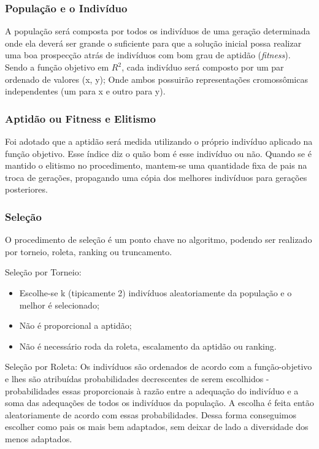 \documentclass[12pt,a4paper]{article}
\begin{document}
\subsubsection{População e o Indivíduo}

\hspace{4ex}A população será composta por todos os indivíduos de uma geração determinada onde ela deverá ser grande o suficiente para que a solução inicial possa realizar uma boa prospecção atrás de indivíduos com bom grau de aptidão (\textit{fitness}). Sendo a função objetivo em $R^2$, cada indivíduo será composto por um par ordenado de valores (x, y); Onde ambos possuirão representações cromossômicas independentes (um para x e outro para y).

\subsubsection{Aptidão ou Fitness e Elitismo}

\hspace{4ex}Foi adotado que a aptidão será medida utilizando o próprio indivíduo aplicado na função objetivo. Esse índice diz o quão bom é esse indivíduo ou não. Quando se é mantido o elitismo no procedimento, mantem-se uma quantidade fixa de pais na troca de gerações, propagando uma cópia dos melhores indivíduos para gerações posteriores.

\newpage
\thispagestyle{main}

\subsubsection{Seleção}

\hspace{4ex}O procedimento de seleção é um ponto chave no algoritmo, podendo ser realizado por torneio, roleta, ranking ou truncamento.

Seleção por Torneio:
\begin{itemize}
	\item Escolhe-se k (tipicamente 2) indivíduos aleatoriamente da população e o melhor é selecionado;
	\item Não é proporcional a aptidão;
	\item Não é necessário roda da roleta, escalamento da aptidão ou ranking.
\end{itemize}

Seleção por Roleta: Os indivíduos são ordenados de acordo com a função-objetivo e lhes são atribuídas probabilidades decrescentes de serem escolhidos - probabilidades essas proporcionais à razão entre a adequação do indivíduo e a soma das adequações de todos os indivíduos da população. A escolha é feita então aleatoriamente de acordo com essas probabilidades. Dessa forma conseguimos escolher como pais os mais bem adaptados, sem deixar de lado a diversidade dos menos adaptados. 
\end{document}
